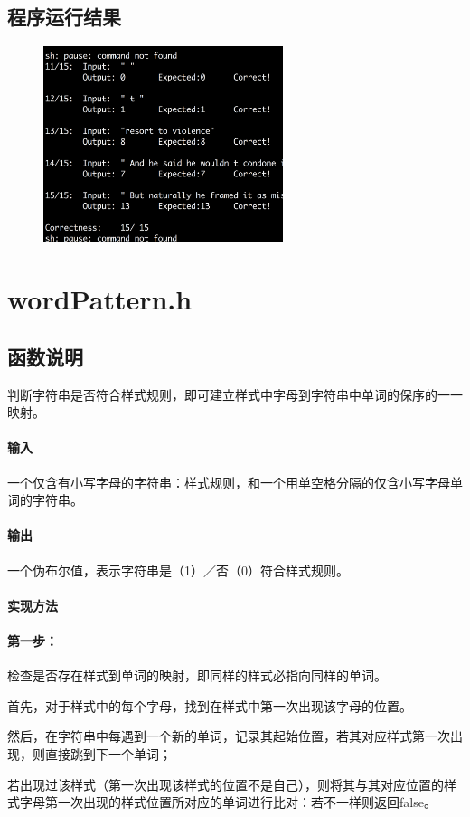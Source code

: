 \documentclass{homework}
\begin{document}
\subsection{程序运行结果}
\begin{figure}[H]
    \centering
    \includegraphics[width=7cm]{lol.png}
\end{figure}
\section{wordPattern.h}
\subsection{函数说明}
判断字符串是否符合样式规则，即可建立样式中字母到字符串中单词的保序的一一映射。
\paragraph{输入}
一个仅含有小写字母的字符串：样式规则，和一个用单空格分隔的仅含小写字母单词的字符串。
\paragraph{输出}
一个伪布尔值，表示字符串是（1）／否（0）符合样式规则。
\paragraph{实现方法}
\paragraph{第一步：}检查是否存在样式到单词的映射，即同样的样式必指向同样的单词。

首先，对于样式中的每个字母，找到在样式中第一次出现该字母的位置。

然后，在字符串中每遇到一个新的单词，记录其起始位置，若其对应样式第一次出现，则直接跳到下一个单词；

若出现过该样式（第一次出现该样式的位置不是自己），则将其与其对应位置的样式字母第一次出现的样式位置所对应的单词进行比对：若不一样则返回false。
\end{document}

